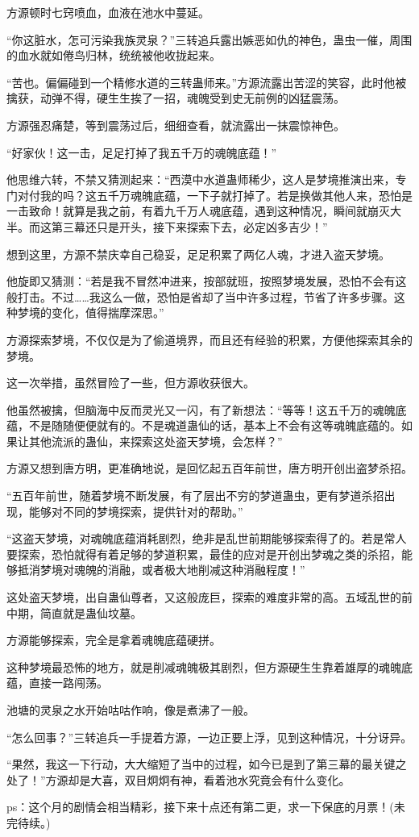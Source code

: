 \begin{this_body}
方源顿时七窍喷血，血液在池水中蔓延。

“你这脏水，怎可污染我族灵泉？”三转追兵露出嫉恶如仇的神色，蛊虫一催，周围的血水就如倦鸟归林，统统被他收拢起来。

“苦也。偏偏碰到一个精修水道的三转蛊师来。”方源流露出苦涩的笑容，此时他被擒获，动弹不得，硬生生挨了一招，魂魄受到史无前例的凶猛震荡。

方源强忍痛楚，等到震荡过后，细细查看，就流露出一抹震惊神色。

“好家伙！这一击，足足打掉了我五千万的魂魄底蕴！”

他思维六转，不禁又猜测起来：“西漠中水道蛊师稀少，这人是梦境推演出来，专门对付我的吗？这五千万魂魄底蕴，一下子就打掉了。若是换做其他人来，恐怕是一击致命！就算是我之前，有着九千万人魂底蕴，遇到这种情况，瞬间就崩灭大半。而这第三幕还只是开头，接下来探索下去，必定凶多吉少！”

想到这里，方源不禁庆幸自己稳妥，足足积累了两亿人魂，才进入盗天梦境。

他旋即又猜测：“若是我不冒然冲进来，按部就班，按照梦境发展，恐怕不会有这般打击。不过……我这么一做，恐怕是省却了当中许多过程，节省了许多步骤。这种梦境的变化，值得揣摩深思。”

方源探索梦境，不仅仅是为了偷道境界，而且还有经验的积累，方便他探索其余的梦境。

这一次举措，虽然冒险了一些，但方源收获很大。

他虽然被擒，但脑海中反而灵光又一闪，有了新想法：“等等！这五千万的魂魄底蕴，不是随随便便就有的。不是魂道蛊仙的话，基本上不会有这等魂魄底蕴的。如果让其他流派的蛊仙，来探索这处盗天梦境，会怎样？”

方源又想到唐方明，更准确地说，是回忆起五百年前世，唐方明开创出盗梦杀招。

“五百年前世，随着梦境不断发展，有了层出不穷的梦道蛊虫，更有梦道杀招出现，能够对不同的梦境探索，提供针对的帮助。”

“这盗天梦境，对魂魄底蕴消耗剧烈，绝非是乱世前期能够探索得了的。若是常人要探索，恐怕就得有着足够的梦道积累，最佳的应对是开创出梦魂之类的杀招，能够抵消梦境对魂魄的消融，或者极大地削减这种消融程度！”

这处盗天梦境，出自蛊仙尊者，又这般庞巨，探索的难度非常的高。五域乱世的前中期，简直就是蛊仙坟墓。

方源能够探索，完全是拿着魂魄底蕴硬拼。

这种梦境最恐怖的地方，就是削减魂魄极其剧烈，但方源硬生生靠着雄厚的魂魄底蕴，直接一路闯荡。

池塘的灵泉之水开始咕咕作响，像是煮沸了一般。

“怎么回事？”三转追兵一手提着方源，一边正要上浮，见到这种情况，十分讶异。

“果然，我这一下行动，大大缩短了当中的过程，如今已是到了第三幕的最关键之处了！”方源却是大喜，双目炯炯有神，看着池水究竟会有什么变化。

ps：这个月的剧情会相当精彩，接下来十点还有第二更，求一下保底的月票！(未完待续。)

\end{this_body}

